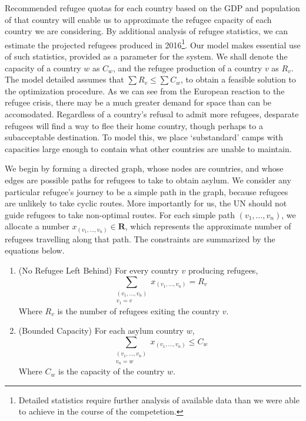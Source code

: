 \documentclass{article}
\begin{document}
Recommended refugee quotas for each country based on the GDP and population of that country will enable us to approximate the refugee capacity of each country we are considering. By additional analysis of refugee statistics, we can estimate the projected refugees produced in 2016\footnote{Detailed statistics require further analysis of available data than we were able to achieve in the course of the competetion.}. Our model makes essential use of such statistics, provided as a parameter for the system. We shall denote the capacity of a country $w$ as $C_w$, and the refugee production of a country $v$ as $R_v$. The model detailed assumes that $\sum R_v \leq \sum C_w$, to obtain a feasible solution to the optimization procedure. As we can see from the European reaction to the refugee crisis, there may be a much greater demand for space than can be accomodated. Regardless of a country's refusal to admit more refugees, desparate refugees will find a way to flee their home country, though perhaps to a subacceptable destination. To model this, we place `substandard' camps with capacities large enough to contain what other countries are unable to maintain.

We begin by forming a directed graph, whose nodes are countries, and whose edges are possible paths for refugees to take to obtain asylum. We consider any particular refugee's journey to be a simple path in the graph, because refugees are unlikely to take cyclic routes. More importantly for us, the UN should not guide refugees to take non-optimal routes. For each simple path $(v_1, \dots, v_n)$, we allocate a number $x_{(v_1, \dots, v_n)} \in \mathbf{R}$, which represents the approximate number of refugees travelling along that path. The constraints are summarized by the equations below.

\begin{enumerate}
    \item (No Refugee Left Behind) For every country $v$ producing refugees,
    \[ \sum_{\substack{(v_1, \dots, v_n) \\ v_1 = v}} x_{(v_1, \dots, v_n)} = R_v \]
    Where $R_v$ is the number of refugees exiting the country $v$.

    \item (Bounded Capacity) For each asylum country $w$,
    \[ \sum_{\substack{(v_1, \dots, v_n) \\ v_n = w}} x_{(v_1, \dots, v_n)} \leq C_w \]
    Where $C_w$ is the capacity of the country $w$.
\end{enumerate}
\end{document}
